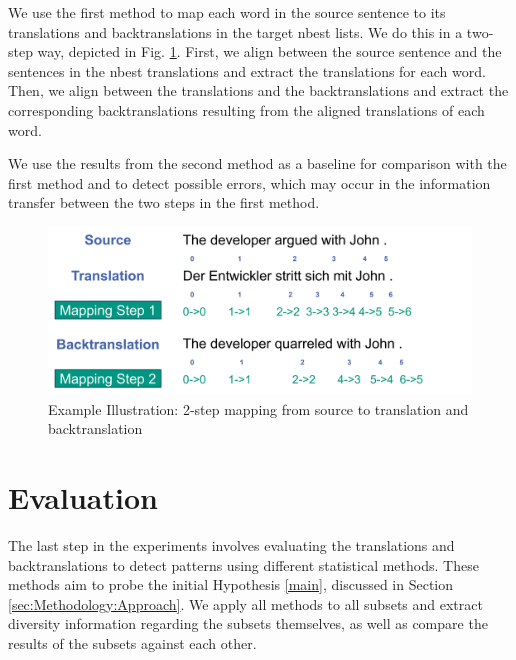 We use the first method to map each word in the source sentence to its translations and backtranslations in the target nbest lists. We do this in a two-step way, depicted in Fig. \ref{fig:alignment}. First, we align between the source sentence and the sentences in the nbest translations and extract the translations for each word. Then, we align between the translations and the backtranslations and extract the corresponding backtranslations resulting from the aligned translations of each word. 

We use the results from the second method as a baseline for comparison with the first method and to detect possible errors, which may occur in the information transfer between the two steps in the first method.

\begin{figure}[!htb]
  \centering
  \includegraphics[scale=0.5]{figures/alignment.png}
  \caption{Example Illustration: 2-step mapping from source to translation and backtranslation}
  \label{fig:alignment}
\end{figure}

\section{Evaluation}
\label{sec:Base_Experiment:Evaluation}

The last step in the experiments involves evaluating the translations and backtranslations to detect patterns using different statistical methods. These methods aim to probe the initial Hypothesis \ref{main}, discussed in Section \ref{sec:Methodology:Approach}. We apply all methods to all subsets and extract diversity information regarding the subsets themselves, as well as compare the results of the subsets against each other.


